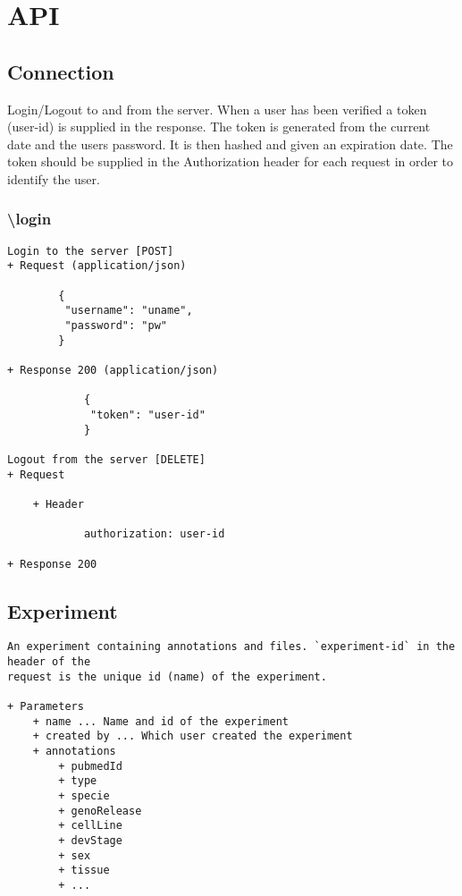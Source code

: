 \label{chap:com_api}
\section{API}

\subsection*{Connection}
Login/Logout to and from the server. When a user has been verified a token (user-id) is supplied in the response. The token is generated from the current date and the users password. It is then hashed and given an expiration date. The token should be supplied in the Authorization header for each request in order to identify the user.

\subsubsection*{\textbackslash login}
\begin{verbatim}
Login to the server [POST]
+ Request (application/json)

        {
         "username": "uname", 
         "password": "pw"
        }

+ Response 200 (application/json)
    
            {
             "token": "user-id"
            }

Logout from the server [DELETE]
+ Request

    + Header
    
            authorization: user-id
        
+ Response 200
\end{verbatim}
\newpage
\subsection*{Experiment}
\begin{verbatim}
An experiment containing annotations and files. `experiment-id` in the header of the 
request is the unique id (name) of the experiment.

+ Parameters
    + name ... Name and id of the experiment
    + created by ... Which user created the experiment
    + annotations 
        + pubmedId
        + type
        + specie
        + genoRelease
        + cellLine
        + devStage
        + sex
        + tissue
        + ...
\end{verbatim}            

